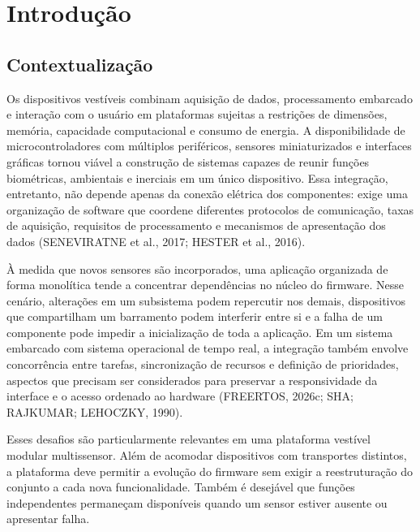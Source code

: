 \documentclass[a4paper,12pt]{article}
\begin{document}
\section{Introdu\c{c}\~ao}

\subsection{Contextualiza\c{c}\~ao}

Os dispositivos vest\'iveis combinam aquisi\c{c}\~ao de dados, processamento embarcado e intera\c{c}\~ao com o usu\'ario em plataformas sujeitas a restri\c{c}\~oes de dimens\~oes, mem\'oria, capacidade computacional e consumo de energia. A disponibilidade de microcontroladores com m\'ultiplos perif\'ericos, sensores miniaturizados e interfaces gr\'aficas tornou vi\'avel a constru\c{c}\~ao de sistemas capazes de reunir fun\c{c}\~oes biom\'etricas, ambientais e inerciais em um \'unico dispositivo. Essa integra\c{c}\~ao, entretanto, n\~ao depende apenas da conex\~ao el\'etrica dos componentes: exige uma organiza\c{c}\~ao de software que coordene diferentes protocolos de comunica\c{c}\~ao, taxas de aquisi\c{c}\~ao, requisitos de processamento e mecanismos de apresenta\c{c}\~ao dos dados (SENEVIRATNE et al., 2017; HESTER et al., 2016).

\`A medida que novos sensores s\~ao incorporados, uma aplica\c{c}\~ao organizada de forma monol\'itica tende a concentrar depend\^encias no n\'ucleo do firmware. Nesse cen\'ario, altera\c{c}\~oes em um subsistema podem repercutir nos demais, dispositivos que compartilham um barramento podem interferir entre si e a falha de um componente pode impedir a inicializa\c{c}\~ao de toda a aplica\c{c}\~ao. Em um sistema embarcado com sistema operacional de tempo real, a integra\c{c}\~ao tamb\'em envolve concorr\^encia entre tarefas, sincroniza\c{c}\~ao de recursos e defini\c{c}\~ao de prioridades, aspectos que precisam ser considerados para preservar a responsividade da interface e o acesso ordenado ao hardware (FREERTOS, 2026c; SHA; RAJKUMAR; LEHOCZKY, 1990).

Esses desafios s\~ao particularmente relevantes em uma plataforma vest\'ivel modular multissensor. Al\'em de acomodar dispositivos com transportes distintos, a plataforma deve permitir a evolu\c{c}\~ao do firmware sem exigir a reestrutura\c{c}\~ao do conjunto a cada nova funcionalidade. Tamb\'em \'e desej\'avel que fun\c{c}\~oes independentes permane\c{c}am dispon\'iveis quando um sensor estiver ausente ou apresentar falha.
\end{document}
